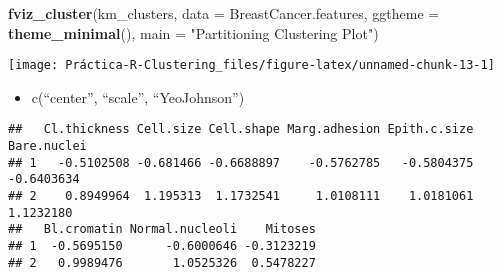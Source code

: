 \documentclass[]{article}
\newenvironment{Shaded}{\begin{snugshade}}{\end{snugshade}}
\newcommand{\CommentTok}[1]{\textcolor[rgb]{0.56,0.35,0.01}{\textit{#1}}}
\newcommand{\DataTypeTok}[1]{\textcolor[rgb]{0.13,0.29,0.53}{#1}}
\newcommand{\DecValTok}[1]{\textcolor[rgb]{0.00,0.00,0.81}{#1}}
\newcommand{\KeywordTok}[1]{\textcolor[rgb]{0.13,0.29,0.53}{\textbf{#1}}}
\newcommand{\NormalTok}[1]{#1}
\newcommand{\OperatorTok}[1]{\textcolor[rgb]{0.81,0.36,0.00}{\textbf{#1}}}
\newcommand{\StringTok}[1]{\textcolor[rgb]{0.31,0.60,0.02}{#1}}
\providecommand{\tightlist}{%
  \setlength{\itemsep}{0pt}\setlength{\parskip}{0pt}}
\begin{document}
\begin{Shaded}
\begin{Highlighting}[]
\KeywordTok{fviz_cluster}\NormalTok{(km_clusters, }\DataTypeTok{data =}\NormalTok{ BreastCancer.features,}
             \DataTypeTok{ggtheme =} \KeywordTok{theme_minimal}\NormalTok{(),}
             \DataTypeTok{main =} \StringTok{"Partitioning Clustering Plot"}\NormalTok{)}
\end{Highlighting}
\end{Shaded}

\begin{center}\texttt{[image: Práctica-R-Clustering\_files/figure-latex/unnamed-chunk-13-1]} \end{center}

\begin{itemize}
\tightlist
\item
  c(``center'', ``scale'', ``YeoJohnson'')
\end{itemize}

\begin{Shaded}
\end{Shaded}

\begin{verbatim}
##   Cl.thickness Cell.size Cell.shape Marg.adhesion Epith.c.size Bare.nuclei
## 1   -0.5102508 -0.681466 -0.6688897    -0.5762785   -0.5804375  -0.6403634
## 2    0.8949964  1.195313  1.1732541     1.0108111    1.0181061   1.1232180
##   Bl.cromatin Normal.nucleoli    Mitoses
## 1  -0.5695150      -0.6000646 -0.3123219
## 2   0.9989476       1.0525326  0.5478227
\end{verbatim}
\end{document}
